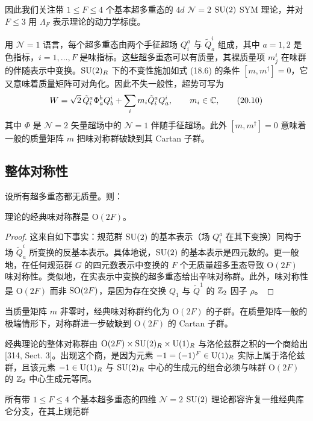 因此我们关注带 $1\le F\le4$ 个基本超多重态的 $4d$ $\mathcal{N}=2$ $\operatorname{SU}(2)$ SYM 理论，并对 $F\le3$ 用 $\Lambda_F$ 表示理论的动力学标度。

用 $\mathcal{N}=1$ 语言，每个超多重态由两个手征超场 $Q^a_i$ 与 $\tilde Q^i_a$ 组成，其中 $a=1,2$ 是色指标，$i=1,\dots,F$ 是味指标。这些超多重态可以有质量，其裸质量项 $m^i_j$ 在味群的伴随表示中变换。$\operatorname{SU}(2)_R$ 下的不变性施加如式 (18.6) 的条件 $[m,m^\dagger]=0$，它又意味着质量矩阵可对角化。因此不失一般性，超势可写为
\begin{equation}
W=\sqrt2\,\tilde Q^a_i\Phi^b_aQ^i_b+\sum_i m_i\tilde Q^a_iQ^i_a,\qquad m_i\in\mathbb{C},
\tag{20.10}
\end{equation}
其中 $\Phi$ 是 $\mathcal{N}=2$ 矢量超场中的 $\mathcal{N}=1$ 伴随手征超场。此外 $[m,m^\dagger]=0$ 意味着一般的质量矩阵 $m$ 把味对称群破缺到其 Cartan 子群。

\subsection{整体对称性}

设所有超多重态都无质量。则：

\begin{proposition}[20.19]
理论的经典味对称群是 $\mathrm{O}(2F)$。
\end{proposition}

\begin{proof}
这来自如下事实：规范群 $\operatorname{SU}(2)$ 的基本表示（场 $Q^a_i$ 在其下变换）同构于场 $\tilde Q^i_a$ 所变换的反基本表示。具体地说，$\operatorname{SU}(2)$ 的基本表示是四元数的。更一般地，在任何规范群 $G$ 的四元数表示中变换的 $F$ 个无质量超多重态导致 $\mathrm{O}(2F)$ 味对称性。类似地，在实表示中变换的超多重态给出辛味对称群。此外，味对称性是 $\mathrm{O}(2F)$ 而非 $\operatorname{SO}(2F)$，是因为存在交换 $Q_1$ 与 $\tilde Q^1$ 的 $\mathbb{Z}_2$ 因子 $\rho$。
\end{proof}

\begin{remark}[20.20]
当质量矩阵 $m$ 非零时，经典味对称群约化为 $\mathrm{O}(2F)$ 的子群。在质量矩阵一般的极端情形下，对称群进一步破缺到 $\mathrm{O}(2F)$ 的 Cartan 子群。
\end{remark}

经典理论的整体对称群由 $\mathrm{O}(2F)\times\operatorname{SU}(2)_R\times\operatorname{U}(1)_R$ 与洛伦兹群之积的一个商给出 [314, Sect. 3]。出现这个商，是因为元素 $-1=(-1)^F\in\operatorname{U}(1)_R$ 实际上属于洛伦兹群，且该元素 $-1\in\operatorname{U}(1)_R$ 与 $\operatorname{SU}(2)_R$ 中心的生成元的组合必须与味群 $\mathrm{O}(2F)$ 的 $\mathbb{Z}_2$ 中心生成元等同。

所有带 $1\le F\le4$ 个基本超多重态的四维 $\mathcal{N}=2$ $\operatorname{SU}(2)$ 理论都容许复一维经典库仑分支，在其上规范群

